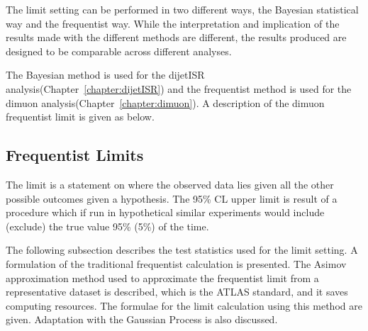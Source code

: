 The limit setting can be performed in two different ways, the Bayesian statistical way and the frequentist way. While the interpretation and implication of the results made with the different methods are different, the results produced are designed to be comparable across different analyses. 

The Bayesian method is used for the dijetISR analysis(Chapter~\ref{chapter:dijetISR}) and the frequentist method is used for the dimuon analysis(Chapter~\ref{chapter:dimuon}). A description of the dimuon frequentist limit is given as below. 

%



\subsection{Frequentist Limits}
\label{sec:freq}
The limit is a statement on where the observed data lies given all the other possible outcomes given a hypothesis. The 95\% CL upper limit is result of a procedure which if run in hypothetical similar experiments would include (exclude) the true value 95\% (5\%) of the time.

The following subsection describes the test statistics used for the limit setting. A formulation of the traditional frequentist calculation is presented. The Asimov approximation method used to approximate the frequentist limit from a representative dataset is described, which is the ATLAS standard, and it saves computing resources. The formulae for the limit calculation using this method are given. Adaptation with the Gaussian Process is also discussed. 

